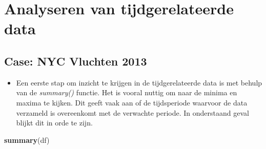 \documentclass[]{memoir}
\newenvironment{Shaded}{\begin{snugshade}}{\end{snugshade}}
\newcommand{\KeywordTok}[1]{\textcolor[rgb]{0.13,0.29,0.53}{\textbf{#1}}}
\newcommand{\NormalTok}[1]{#1}
\providecommand{\tightlist}{%
  \setlength{\itemsep}{0pt}\setlength{\parskip}{0pt}}
\begin{document}
\hypertarget{analyseren-van-tijdgerelateerde-data}{%
\section{Analyseren van tijdgerelateerde data}\label{analyseren-van-tijdgerelateerde-data}}

\hypertarget{case-nyc-vluchten-2013-2}{%
\subsection{Case: NYC Vluchten 2013}\label{case-nyc-vluchten-2013-2}}

\begin{itemize}
\tightlist
\item
  Een eerste stap om inzicht te krijgen in de tijdgerelateerde data is met behulp van de \emph{summary()} functie. Het is vooral nuttig om naar de minima en maxima te kijken. Dit geeft vaak aan of de tijdsperiode waarvoor de data verzameld is overeenkomt met de verwachte periode. In onderstaand geval blijkt dit in orde te zijn.
\end{itemize}

\begin{Shaded}
\begin{Highlighting}[]
\KeywordTok{summary}\NormalTok{(df)}
\end{Highlighting}
\end{Shaded}
\end{document}
